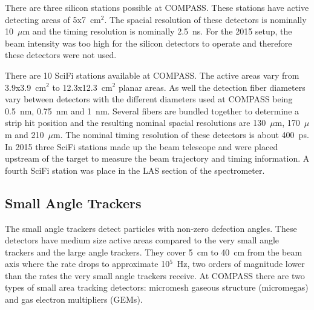 There are three silicon stations possible at COMPASS.  These stations have
active detecting areas of 5x7~cm$^2$.  The spacial resolution of these detectors
is nominally 10~$\mu$m and the timing resolution is nominally 2.5~ns.  For the
2015 setup, the beam intensity was too high for the silicon detectors to operate
and therefore these detectors were not used. \par

There are 10 SciFi stations available at COMPASS.  The active areas vary from
3.9x3.9~cm$^2$ to 12.3x12.3~cm$^2$ planar areas.  As well the detection fiber
diameters vary between detectors with the different diameters used at COMPASS
being 0.5~nm, 0.75~nm and 1~nm.  Several fibers are bundled together to
determine a strip hit position and the resulting nominal spacial resolutions are
130~$\mu$m, 170~$\mu$m and 210~$\mu$m.  The nominal timing resolution of these
detectors is about 400~ps.  In 2015 three SciFi stations made up the beam
telescope and were placed upstream of the target to measure the beam trajectory
and timing information.  A fourth SciFi station was place in the LAS section of
the spectrometer. \par

\subsection{Small Angle Trackers} \label{sec::SAT}
The small angle trackers detect particles with non-zero defection angles. These
detectors have medium size active areas compared to the very small angle
trackers and the large angle trackers.  They cover 5~cm to 40~cm from the beam
axis where the rate drops to approximate 10$^5$~Hz, two orders of magnitude
lower than the rates the very small angle trackers receive.  At COMPASS there
are two types of small area tracking detectors: micromesh gaseous structure
(micromegas) and gas electron multipliers (GEMs). \par

